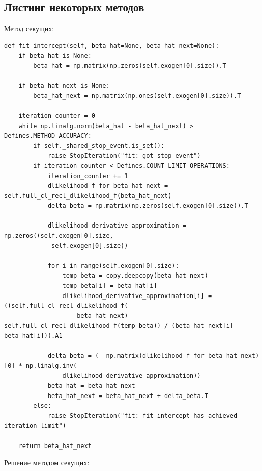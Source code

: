 \documentclass[a4paper,14pt]{extarticle}
\begin{document}
\subsection{Листинг некоторых методов}
Метод секущих:
\begin{Verbatim}[fontsize=\scriptsize]
def fit_intercept(self, beta_hat=None, beta_hat_next=None):
    if beta_hat is None:
        beta_hat = np.matrix(np.zeros(self.exogen[0].size)).T

    if beta_hat_next is None:
        beta_hat_next = np.matrix(np.ones(self.exogen[0].size)).T

    iteration_counter = 0
    while np.linalg.norm(beta_hat - beta_hat_next) > Defines.METHOD_ACCURACY:
        if self._shared_stop_event.is_set():
            raise StopIteration("fit: got stop event")
        if iteration_counter < Defines.COUNT_LIMIT_OPERATIONS:
            iteration_counter += 1
            dlikelihood_f_for_beta_hat_next = self.full_cl_recl_dlikelihood_f(beta_hat_next)
            delta_beta = np.matrix(np.zeros(self.exogen[0].size)).T

            dlikelihood_derivative_approximation = np.zeros((self.exogen[0].size,
             self.exogen[0].size))

            for i in range(self.exogen[0].size):
                temp_beta = copy.deepcopy(beta_hat_next)
                temp_beta[i] = beta_hat[i]
                dlikelihood_derivative_approximation[i] = ((self.full_cl_recl_dlikelihood_f(
                    beta_hat_next) - self.full_cl_recl_dlikelihood_f(temp_beta)) / (beta_hat_next[i] - beta_hat[i])).A1

            delta_beta = (- np.matrix(dlikelihood_f_for_beta_hat_next)[0] * np.linalg.inv(
                dlikelihood_derivative_approximation))
            beta_hat = beta_hat_next
            beta_hat_next = beta_hat_next + delta_beta.T
        else:
            raise StopIteration("fit: fit_intercept has achieved iteration limit")

    return beta_hat_next
\end{Verbatim}
Решение методом секущих:
\end{document}
